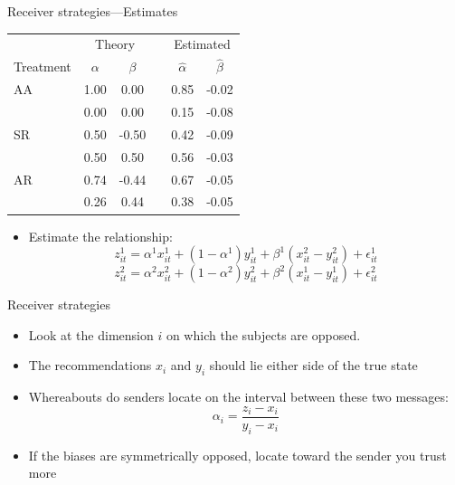 \documentclass{beamer}
\begin{document}
\begin{frame}{Receiver strategies---Estimates}
	\begin{center}
		\begin{tabular}{lccccc}\hline
		 & \multicolumn{2}{c}{Theory} & & \multicolumn{2}{c}{Estimated}\\\cline{2-3}\cline{5-6}
		Treatment & $\alpha$ & $\beta$  & & $\hat{\alpha}$ & $\hat{\beta}$ \\ \hline
			AA  & 1.00 & 0.00 & &0.85 & -0.02 \\
			    & 0.00 & 0.00 & &0.15 & -0.08\\
			SR  & 0.50 & -0.50 & &0.42 &-0.09 \\
			    & 0.50 & 0.50 & &0.56 &-0.03 \\
			AR  & 0.74 & -0.44 & &0.67 &-0.05 \\
			    & 0.26 & 0.44 &  &0.38 &-0.05 \\ \hline
		\end{tabular}
	\end{center}
	\begin{itemize}
		\item Estimate the relationship:
			$$z^1_{it}=\alpha^1 x^1_{it}+(1-\alpha^1)y^1_{it} +\beta^1(x^2_{it}-y^2_{it}) +\epsilon^1_{it}$$
			$$z^2_{it}=\alpha^2 x^2_{it}+(1-\alpha^2)y^2_{it} +\beta^2(x^1_{it}-y^1_{it}) +\epsilon^2_{it}$$
	\end{itemize}
\end{frame}


\begin{frame}{Receiver strategies}
	\begin{itemize}
		\item Look at the dimension $i$ on which the subjects are opposed.
		\item The recommendations $x_i$ and $y_i$ should lie either side of the true state\pause
		\item Whereabouts do senders locate on the interval between these two messages:
		$$\alpha_i=\frac{z_i-x_i}{y_i-x_i} $$\pause
		\item If the biases are symmetrically opposed, locate toward the sender you trust more
	\end{itemize}
\end{frame}
\end{document}
